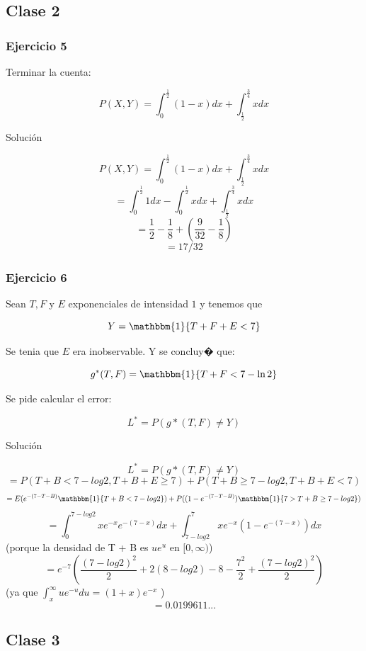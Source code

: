 \documentclass[a4paper,10pt]{article}
\begin{document}
	\subsection{Clase 2}
	
	\subsubsection{Ejercicio 5}
	
	Terminar la cuenta:
	
	$$ P(X,Y) = \int_{0}^{\frac{1}{2}} (1-x) dx + \int_{\frac{1}{2}}^{\frac{3}{4}} x dx $$
	
    Solución
    
    $$ P(X,Y) = \int_{0}^{\frac{1}{2}} (1-x) dx + \int_{\frac{1}{2}}^{\frac{3}{4}} x dx $$
	$$ = \int_{0}^{\frac{1}{2}} 1 dx - \int_{0}^{\frac{1}{2}} x dx + \int_{\frac{1}{2}}^{\frac{3}{4}} x dx $$
	$$ = {\frac{1}{2}} - {\frac{1}{8}} + ({\frac{9}{32}} - {\frac{1}{8}}) $$
	$$ = 17/32 $$
	
	
	\subsubsection{Ejercicio 6}
	
	Sean $T, F$ y $E$ exponenciales de intensidad $1$ y tenemos que 
	
	$$ Y = \mathbbm{1}\{T + F + E < 7\}$$
	
	Se tenia que $E$ era inobservable. Y se concluy� que:
	
	$$ g^*(T,F) = \mathbbm{1}\{ T+ F < 7 - \ln{2}\}$$
	
	Se pide calcular el error:
	
	$$L^* = P ( g*(T,F) \neq Y)$$
	
	Solución
	
	$$L^* = P ( g*(T,F) \neq Y) $$
	$$ = P(T + B < 7 - log2 , T + B + E \geq 7) + P(T + B \geq 7 - log2, T + B + E < 7)$$
	$$ = E(e^{-(7-T-B)} \mathbbm{1}\{T + B < 7 - log2\}) + P((1-e^{-(7-T-B)}) \mathbbm{1}\{7 > T + B \geq 7 - log2 \}) $$
	$$ = \int_{0}^{7 - log2} x e^{-x} e^{-(7-x)} dx  + \int_{7-log2}^{7} x e^{-x} (1-e^{-(7-x)}) dx $$
	(porque la densidad de T + B es $ue^{u}$ en $[0,\infty)$)
	$$ = e^{-7} \left({\frac{(7-log2)^2}{2}} + 2(8-log2)-8-{\frac{7^2}{2}} + {\frac{(7-log2)^2}{2}} \right) $$
	(ya que $ \int_{x}^{\infty} u e^{-u} du = (1+x)e^{-x}$ )
	$$ = 0.0199611... $$
	
	
	\subsection{Clase 3}
	
\end{document}
